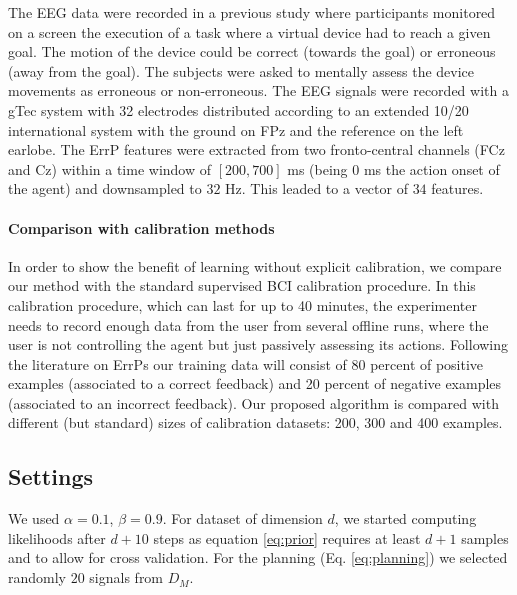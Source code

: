 The EEG data were recorded in a previous study \cite{iturrate2013task} where participants monitored on a screen the execution of a task where a virtual device had to reach a given goal. The motion of the device could be correct (towards the goal) or erroneous (away from the goal). The subjects were asked to mentally assess the device movements as erroneous or non-erroneous. The EEG signals were recorded with a gTec system with 32 electrodes distributed according to an extended 10/20 international system with the ground on FPz and the reference on the left earlobe. The ErrP features were extracted from two fronto-central channels (FCz and Cz) within a time window of $[200,700]$ ms (being 0 ms the action onset of the agent) and downsampled to $32$ Hz. This leaded to a vector of $34$ features.

\paragraph{Comparison with calibration methods}
In order to show the benefit of learning without explicit calibration, we compare our method with the standard supervised BCI calibration procedure. In this calibration procedure, which can last for up to 40 minutes, the experimenter needs to record enough data from the user from several offline runs, where the user is not controlling the agent but just passively assessing its actions.
%
Following the literature on ErrPs \cite{chavarriaga2010learning,iturrate2013task} our training data will consist of 80 percent of positive examples (associated to a correct feedback) and 20 percent of negative examples (associated to an incorrect feedback). Our proposed algorithm is compared with different (but standard) sizes of calibration datasets: 200, 300 and 400 examples.


\subsection{Settings}

We used $\alpha = 0.1$, $\beta = 0.9$. For dataset of dimension $d$, we started computing likelihoods after $d+10$ steps as equation \ref{eq:prior} requires at least $d+1$ samples and to allow for cross validation. For the planning (Eq. \ref{eq:planning}) we selected randomly $20$ signals from $D_M$.

